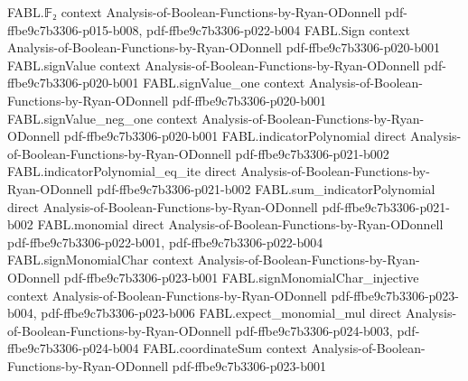\begin{theorem}
\label{FABL.goldreichLevinOutput_sound_of_accurate}
\leanok
{}
\proofstep
  {FABL.𝔽₂}
  {context}
  {Analysis-of-Boolean-Functions-by-Ryan-ODonnell}
  {pdf-ffbe9c7b3306-p015-b008,
    pdf-ffbe9c7b3306-p022-b004}
\proofstep
  {FABL.Sign}
  {context}
  {Analysis-of-Boolean-Functions-by-Ryan-ODonnell}
  {pdf-ffbe9c7b3306-p020-b001}
\proofstep
  {FABL.signValue}
  {context}
  {Analysis-of-Boolean-Functions-by-Ryan-ODonnell}
  {pdf-ffbe9c7b3306-p020-b001}
\proofstep
  {FABL.signValue_one}
  {context}
  {Analysis-of-Boolean-Functions-by-Ryan-ODonnell}
  {pdf-ffbe9c7b3306-p020-b001}
\proofstep
  {FABL.signValue_neg_one}
  {context}
  {Analysis-of-Boolean-Functions-by-Ryan-ODonnell}
  {pdf-ffbe9c7b3306-p020-b001}
\proofstep
  {FABL.indicatorPolynomial}
  {direct}
  {Analysis-of-Boolean-Functions-by-Ryan-ODonnell}
  {pdf-ffbe9c7b3306-p021-b002}
\proofstep
  {FABL.indicatorPolynomial_eq_ite}
  {direct}
  {Analysis-of-Boolean-Functions-by-Ryan-ODonnell}
  {pdf-ffbe9c7b3306-p021-b002}
\proofstep
  {FABL.sum_indicatorPolynomial}
  {direct}
  {Analysis-of-Boolean-Functions-by-Ryan-ODonnell}
  {pdf-ffbe9c7b3306-p021-b002}
\proofstep
  {FABL.monomial}
  {direct}
  {Analysis-of-Boolean-Functions-by-Ryan-ODonnell}
  {pdf-ffbe9c7b3306-p022-b001,
    pdf-ffbe9c7b3306-p022-b004}
\proofstep
  {FABL.signMonomialChar}
  {context}
  {Analysis-of-Boolean-Functions-by-Ryan-ODonnell}
  {pdf-ffbe9c7b3306-p023-b001}
\proofstep
  {FABL.signMonomialChar_injective}
  {context}
  {Analysis-of-Boolean-Functions-by-Ryan-ODonnell}
  {pdf-ffbe9c7b3306-p023-b004,
    pdf-ffbe9c7b3306-p023-b006}
\proofstep
  {FABL.expect_monomial_mul}
  {direct}
  {Analysis-of-Boolean-Functions-by-Ryan-ODonnell}
  {pdf-ffbe9c7b3306-p024-b003,
    pdf-ffbe9c7b3306-p024-b004}
\proofstep
  {FABL.coordinateSum}
  {context}
  {Analysis-of-Boolean-Functions-by-Ryan-ODonnell}
  {pdf-ffbe9c7b3306-p023-b001}

\end{theorem}
